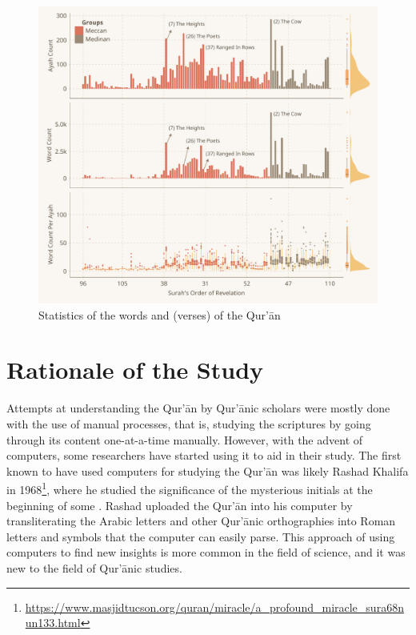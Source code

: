 \begin{figure}[!b]
    \centering
    \includegraphics[width=\textwidth]{img/plot2.pdf}
    \caption{Statistics of the words and   (verses) of the Qur'\=an}
    \label{fig:ayah_word_count}
\end{figure}

\section{Rationale of the Study}\label{sec:rationale}
Attempts at understanding the Qur'\=an by Qur'\=anic scholars were mostly done with the use of manual processes, that is, studying the scriptures by going through its content one-at-a-time manually. However, with the advent of computers, some researchers have started using it to aid in their study. The first known to have used computers for studying the Qur'\=an was likely Rashad Khalifa in 1968\footnote{\url{https://www.masjidtucson.org/quran/miracle/a_profound_miracle_sura68nun133.html}}, where he studied the significance of the mysterious initials at the beginning of some  . Rashad uploaded the Qur'\=an into his computer by transliterating the Arabic letters and other Qur'\=anic orthographies into Roman letters and symbols that the computer can easily parse. This approach of using computers to find new insights is more common in the field of science, and it was new to the field of Qur'\=anic studies.

